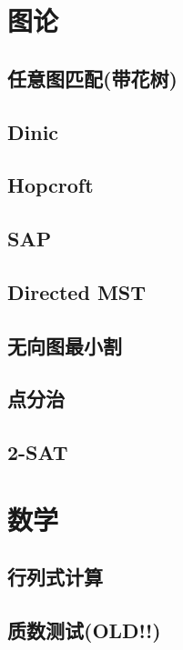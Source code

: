 \documentclass[a4papar,landscape]{article}
\begin{document}
\begin{multicols}{2}
\section{图论}

	\subsection{任意图匹配(带花树)}
		
	\subsection{Dinic}
		
	\subsection{Hopcroft}
		
	\subsection{SAP}
		
	\subsection{Directed MST}
		
	\subsection{无向图最小割}
		
	\subsection{点分治}
		
	\lstset{language=Java}
	\subsection{2-SAT}
		
	\lstset{language=C++}

\section{数学}

	\subsection{行列式计算}
		
	\subsection{质数测试(OLD!!)}
		

\end{multicols}
\end{document}
